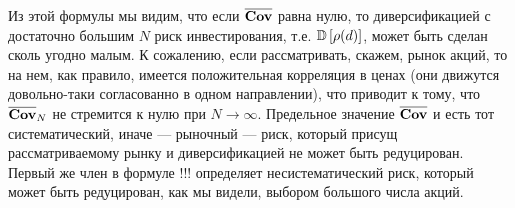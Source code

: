 Из этой формулы мы видим, что если $\overline{\textbf{Cov}}$ равна нулю, то диверсификацией с достаточно большим $N$ риск инвестирования,
т.е. $\mathbb{D}\left[\rho(d)\right]$, может быть сделан сколь угодно малым. К сожалению, если рассматривать, скажем, рынок акций, то на нем, как правило,
имеется положительная корреляция в ценах (они движутся довольно-таки согласованно в одном направлении), что приводит к тому, что
$\overline{\textbf{Cov}}_N$ не стремится к нулю при $N \rightarrow \infty$. Предельное значение $\overline{\textbf{Cov}}$ и есть тот систематический,
иначе --- рыночный --- риск, который присущ рассматриваемому рынку и диверсификацией не может быть редуцирован. Первый же член в формуле
!!! определяет несистематический риск, который может быть редуцирован, как мы видели, выбором большого числа акций.